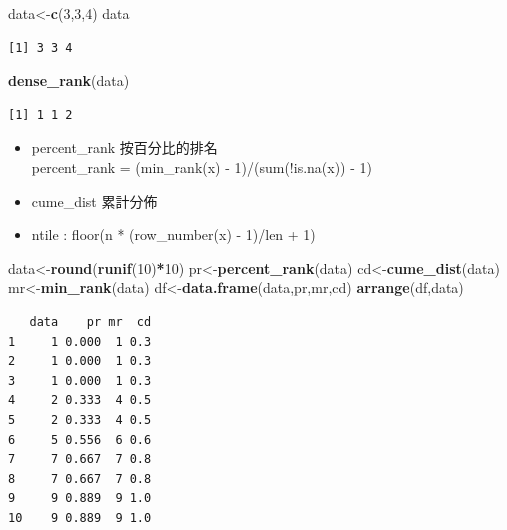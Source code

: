 \documentclass[]{book}
\newenvironment{Shaded}{\begin{snugshade}}{\end{snugshade}}
\newcommand{\DecValTok}[1]{\textcolor[rgb]{0.00,0.00,0.81}{#1}}
\newcommand{\KeywordTok}[1]{\textcolor[rgb]{0.13,0.29,0.53}{\textbf{#1}}}
\newcommand{\NormalTok}[1]{#1}
\newcommand{\OperatorTok}[1]{\textcolor[rgb]{0.81,0.36,0.00}{\textbf{#1}}}
\theoremstyle{definition}
\theoremstyle{definition}
\theoremstyle{definition}
\theoremstyle{remark}
\begin{document}
\begin{Shaded}
\begin{Highlighting}[]
\NormalTok{data<-}\KeywordTok{c}\NormalTok{(}\DecValTok{3}\NormalTok{,}\DecValTok{3}\NormalTok{,}\DecValTok{4}\NormalTok{)  }
\NormalTok{data}
\end{Highlighting}
\end{Shaded}

\begin{verbatim}
[1] 3 3 4
\end{verbatim}

\begin{Shaded}
\begin{Highlighting}[]
\KeywordTok{dense_rank}\NormalTok{(data)}
\end{Highlighting}
\end{Shaded}

\begin{verbatim}
[1] 1 1 2
\end{verbatim}

\begin{itemize}
\item
  percent\_rank 按百分比的排名\\
  percent\_rank = (min\_rank(x) - 1)/(sum(!is.na(x)) - 1)\\
\item
  cume\_dist 累計分佈
\item
  ntile : floor(n * (row\_number(x) - 1)/len + 1)
\end{itemize}

\begin{Shaded}
\begin{Highlighting}[]
\NormalTok{data<-}\KeywordTok{round}\NormalTok{(}\KeywordTok{runif}\NormalTok{(}\DecValTok{10}\NormalTok{)}\OperatorTok{*}\DecValTok{10}\NormalTok{)}
\NormalTok{pr<-}\KeywordTok{percent_rank}\NormalTok{(data)}
\NormalTok{cd<-}\KeywordTok{cume_dist}\NormalTok{(data)}
\NormalTok{mr<-}\KeywordTok{min_rank}\NormalTok{(data)}
\NormalTok{df<-}\KeywordTok{data.frame}\NormalTok{(data,pr,mr,cd)}
\KeywordTok{arrange}\NormalTok{(df,data)}
\end{Highlighting}
\end{Shaded}

\begin{verbatim}
   data    pr mr  cd
1     1 0.000  1 0.3
2     1 0.000  1 0.3
3     1 0.000  1 0.3
4     2 0.333  4 0.5
5     2 0.333  4 0.5
6     5 0.556  6 0.6
7     7 0.667  7 0.8
8     7 0.667  7 0.8
9     9 0.889  9 1.0
10    9 0.889  9 1.0
\end{verbatim}
\end{document}
